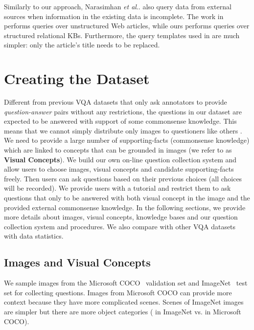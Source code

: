 \documentclass[10pt,journal]{IEEEtran}
\makeatletter
\DeclareRobustCommand\onedot{\futurelet\@let@token\@onedot}
\def\@onedot{\ifx\@let@token.\else.\null\fi\xspace}
\def\etal{\emph{et al}\onedot}
\def\bluett{}
\makeatother
\begin{document}
\bluett{
	Similarly to our approach, 
	Narasimhan \etal \cite{narasimhan2016improving} also query data from external sources when
	information in the existing data is incomplete.
	The work in \cite{narasimhan2016improving} performs queries over unstructured Web articles, while ours 
	performs queries over structured relational KBs.
	Furthermore, the query templates used in \cite{narasimhan2016improving} are much simpler: only the article’s title
	needs to be replaced.}



\section{Creating the \KBName Dataset}
\label{dataset}
Different from previous VQA datasets \cite{antol2015vqa,gao2015you,Yu_2015_ICCV,ren2015image,zhu2015visual7w} that only ask annotators to provide {\em question-answer} pairs without any restrictions, 
{the questions in our dataset are expected to be answered with support of some commonsense knowledge.}
This means that we cannot simply distribute only images to questioners like others \cite{antol2015vqa,zhu2015visual7w}. 
\bluett{
We need to provide a large number of supporting-facts (commonsense knowledge) which are linked to 
concepts that can be grounded in images (we refer to as {\bf Visual Concepts}). }
We build our own on-line question collection system and allow users to choose images, visual concepts and candidate supporting-facts freely. Then users can ask questions based on their previous choices (all choices will be recorded). We provide users with a tutorial and restrict them to ask questions that only to be answered with both visual concept in the image and the provided external commonsense knowledge. In the following sections, we provide more details about images, visual concepts, knowledge bases and our question collection system and procedures. We also compare with other VQA datasets with data statistics.

\subsection{Images and Visual Concepts}
\label{sec:imgvc}

We sample  images from the Microsoft COCO~\cite{lin2014microsoft} validation set and ImageNet~\cite{deng2009imagenet} test set for collecting questions. Images from Microsoft COCO can provide more context because they have more complicated scenes. Scenes of ImageNet images are simpler but there are more object categories ( in ImageNet vs.  in Microsoft COCO).
\end{document}

